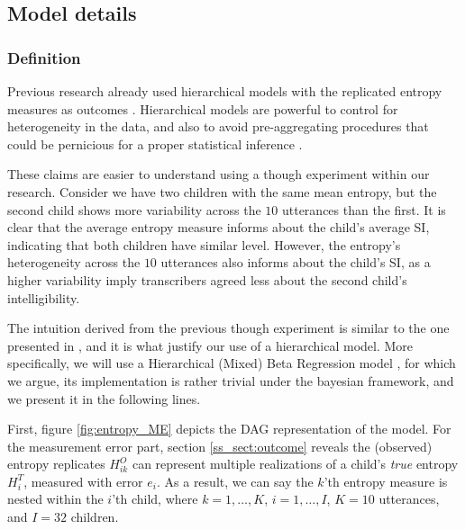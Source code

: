 


\subsection{Model details}

\subsubsection{Definition}
%
Previous research already used hierarchical models with the replicated entropy measures as outcomes \citep{Boonen_et_al_2021, Faes_et_al_2021}. Hierarchical models are powerful to control for heterogeneity in the data, and also to avoid pre-aggregating procedures that could be pernicious for a proper statistical inference \citep{McElreath_2020}. 

These claims are easier to understand using a though experiment within our research. Consider we have two children with the same mean entropy, but the second child shows more variability across the $10$ utterances than the first. It is clear that the average entropy measure informs about the child's average SI, indicating that both children have similar level. However, the entropy's heterogeneity across the $10$ utterances also informs about the child's SI, as a higher variability imply transcribers agreed less about the second child's intelligibility.

The intuition derived from the previous though experiment is similar to the one presented in \citet{Boonen_et_al_2021}, and it is what justify our use of a hierarchical model. More specifically, we will use a Hierarchical (Mixed) Beta Regression model \citep{Figueroa-Zuniga_et_al_2013}, for which we argue, its implementation is rather trivial under the bayesian framework, and we present it in the following lines.

First, figure \ref{fig:entropy_ME} depicts the DAG representation of the model. For the measurement error part, section \ref{ss_sect:outcome} reveals the (observed) entropy replicates $H^{O}_{ik}$ can represent multiple realizations of a child's \textit{true} entropy $H^{T}_{i}$, measured with error $e_i$. As a result, we can say the $k$'th entropy measure is nested within the $i$'th child, where $k=1, \dots, K$, $i=1, \dots, I$, $K = 10$ utterances, and $I = 32$ children.

